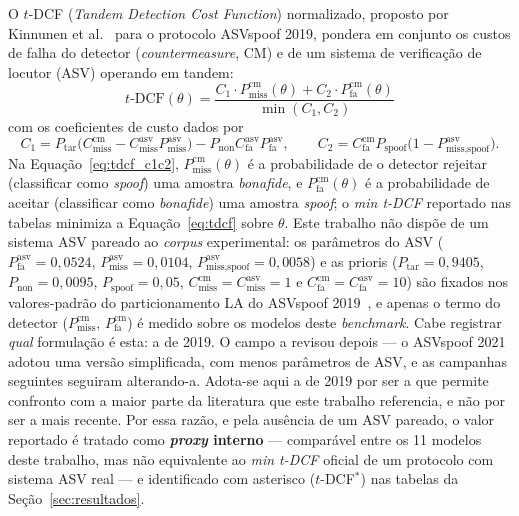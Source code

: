 \documentclass[12pt,a4paper]{article}
\begin{document}
O $t$-DCF (\textit{Tandem Detection Cost Function}) normalizado, proposto por
Kinnunen et al.~\cite{kinnunen2018tdcf} para o protocolo ASVspoof 2019, pondera
em conjunto os custos de falha do detector (\textit{countermeasure}, CM) e de
um sistema de verificação de locutor (ASV) operando em tandem:
\begin{equation}
	\label{eq:tdcf}
	t\text{-DCF}(\theta) = \frac{C_1 \cdot P_{\text{miss}}^{\text{cm}}(\theta) +
		C_2 \cdot P_{\text{fa}}^{\text{cm}}(\theta)}{\min(C_1, C_2)}
\end{equation}
\noindent
com os coeficientes de custo dados por
\begin{equation}
	\label{eq:tdcf_c1c2}
C_1 = P_{\text{tar}}\big(C_{\text{miss}}^{\text{cm}} -
C_{\text{miss}}^{\text{asv}} P_{\text{miss}}^{\text{asv}}\big)
- P_{\text{non}} C_{\text{fa}}^{\text{asv}} P_{\text{fa}}^{\text{asv}}, \qquad
C_2 = C_{\text{fa}}^{\text{cm}} P_{\text{spoof}}
\big(1 - P_{\text{miss,spoof}}^{\text{asv}}\big).
\end{equation}
\noindent
Na Equação~\ref{eq:tdcf_c1c2}, $P_{\text{miss}}^{\text{cm}}(\theta)$ é a
probabilidade de o detector rejeitar (classificar como \textit{spoof}) uma
amostra \textit{bonafide}, e
$P_{\text{fa}}^{\text{cm}}(\theta)$ é a probabilidade de aceitar (classificar
como \textit{bonafide}) uma amostra \textit{spoof}; o \textit{min t-DCF}
reportado nas tabelas minimiza a Equação~\ref{eq:tdcf} sobre $\theta$. Este
trabalho não dispõe de um sistema ASV pareado ao \textit{corpus} experimental:
os parâmetros do ASV ($P_{\text{fa}}^{\text{asv}}=0{,}0524$,
$P_{\text{miss}}^{\text{asv}}=0{,}0104$,
$P_{\text{miss,spoof}}^{\text{asv}}=0{,}0058$) e as prioris
($P_{\text{tar}}=0{,}9405$, $P_{\text{non}}=0{,}0095$, $P_{\text{spoof}}=0{,}05$,
$C_{\text{miss}}^{\text{cm}}=C_{\text{miss}}^{\text{asv}}=1$ e
$C_{\text{fa}}^{\text{cm}}=C_{\text{fa}}^{\text{asv}}=10$) são fixados nos valores-padrão do
particionamento LA do ASVspoof 2019~\cite{kinnunen2018tdcf}, e apenas o termo do
detector ($P_{\text{miss}}^{\text{cm}}$, $P_{\text{fa}}^{\text{cm}}$) é medido
sobre os modelos deste \textit{benchmark}. Cabe registrar \emph{qual} formulação é esta: a de \num{2019}. O campo a
revisou depois --- o ASVspoof \num{2021} adotou uma versão simplificada, com
menos parâmetros de ASV, e as campanhas seguintes seguiram alterando-a. Adota-se
aqui a de \num{2019} por ser a que permite confronto com a maior parte da
literatura que este trabalho referencia, e não por ser a mais recente. Por essa
razão, e pela ausência de um ASV pareado, o valor reportado é tratado como
\textbf{\textit{proxy} interno} --- comparável entre os
\num{11} modelos deste trabalho, mas não equivalente ao \textit{min t-DCF}
oficial de um protocolo com sistema ASV real --- e identificado com asterisco
($t$-DCF$^\ast$) nas tabelas da Seção~\ref{sec:resultados}.
\end{document}
